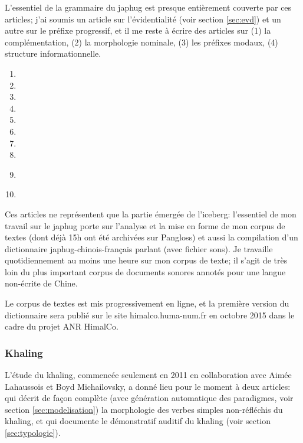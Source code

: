 \documentclass[oldfontcommands,oneside,a4paper,11pt]{article}
\begin{document}
L'essentiel de la grammaire du japhug est presque entièrement couverte par ces articles; j'ai soumis un article sur l'évidentialité (voir section \ref{sec:evd}) et un autre sur le préfixe progressif, et il me reste à écrire des articles sur (1) la complémentation, (2) la morphologie nominale, (3) les préfixes modaux, (4) structure informationnelle. 

\begin{enumerate}
\item {}
\item {}
\item {}
\item {}
\item {}
\item {}
\item  {}
\item {}   
\item{ }
\item {}  
\end{enumerate} 

Ces articles ne représentent que la partie émergée de l'iceberg: l'essentiel de mon travail sur le japhug porte sur l'analyse et la mise en forme de mon corpus de textes (dont déjà 15h ont été archivées sur Pangloss) et aussi la compilation d'un dictionnaire japhug-chinois-français parlant (avec fichier sons). Je travaille quotidiennement au moins une heure sur mon corpus de texte; il s'agit de très loin du plus important corpus de documents sonores annotés pour une langue non-écrite de Chine.

Le corpus de textes est mis progressivement en ligne, et la première version du dictionnaire sera publié sur le site himalco.huma-num.fr en octobre 2015 dans le cadre du projet ANR HimalCo.


\subsubsection{Khaling} \label{sec:khaling}
L'étude du khaling, commencée seulement en 2011 en collaboration avec Aimée Lahaussois et Boyd Michailovsky, a donné lieu pour le moment à deux articles: \citet{jacques12khaling} qui décrit de façon complète (avec génération automatique des paradigmes, voir section \ref{sec:modelisation}) la morphologie des verbes simples non-réfléchis du khaling, et \citet{jacques14auditory} qui documente le démonstratif auditif du khaling (voir section \ref{sec:typologie}).
\end{document}
